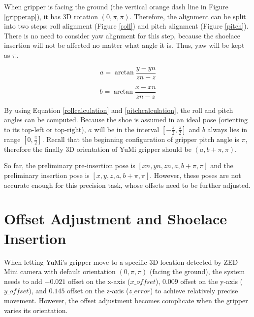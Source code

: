 When gripper is facing the ground (the vertical orange dash line in Figure \ref{gripperap}), it has 3D rotation $(0, \pi, \pi)$. Therefore, the alignment can be split into two steps: roll alignment (Figure \ref{roll}) and pitch alignment (Figure \ref{pitch}). There is no need to consider yaw alignment for this step, because the shoelace insertion will not be affected no matter what angle it is. Thus, yaw will be kept as $\pi$.

\begin{equation}
a = \arctan \frac{y - yn}{zn - z}
\label{rollcalculation}
\end{equation}

\begin{equation}
b = \arctan \frac{x - xn}{zn - z}
\label{pitchcalculation}
\end{equation}

By using Equation \ref{rollcalculation} and \ref{pitchcalculation}, the roll and pitch angles can be computed. Because the shoe is assumed in an ideal pose (orienting to its top-left or top-right), $a$ will be in the interval $[-\frac{\pi}{2}, \frac{\pi}{2}]$ and $b$ always lies in range $[0, \frac{\pi}{2}]$. Recall that the beginning configuration of gripper pitch angle is $\pi$, therefore the finally 3D orientation of YuMi gripper should be $(a, b + \pi, \pi)$. 

So far, the preliminary pre-insertion pose is $[xn, yn, zn, a, b + \pi, \pi]$ and the preliminary insertion pose is $[x, y, z, a, b + \pi, \pi]$. However, these poses are not accurate enough for this precision task, whose offsets need to be further adjusted.

\section{Offset Adjustment and Shoelace Insertion} \label{offsetadjustment}
When letting YuMi's gripper move to a specific 3D location detected by ZED Mini camera with default orientation $(0, \pi, \pi)$ (facing the ground), the system needs to add $-0.021$ offset on the x-axis ($x\_offset$), $0.009$ offset on the y-axis ($y\_offset$), and $0.145$ offset on the z-axis ($z\_error$) to achieve relatively precise movement. However, the offset adjustment becomes complicate when the gripper varies its orientation.


